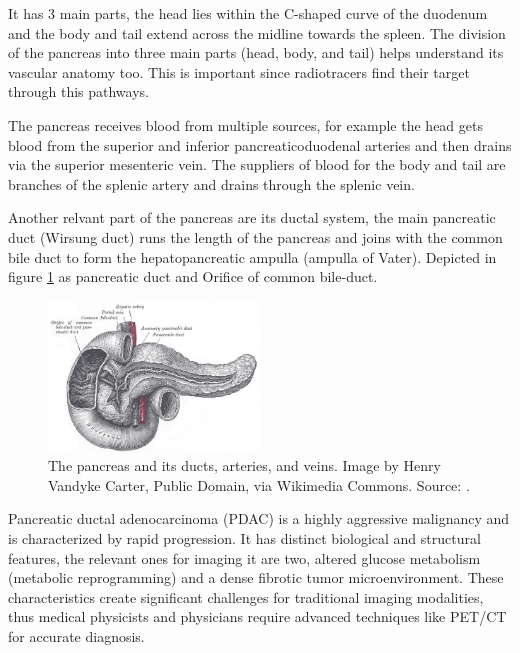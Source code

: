 \documentclass[11pt]{article} %
\begin{document}
It has 3 main parts, the head lies within the C-shaped curve of the duodenum and the body and tail extend across the midline towards the spleen. \cite{kenhub_pancreas} The division of the pancreas into three main parts (head, body, and tail) helps understand its vascular anatomy too. This is important since radiotracers find their target through this pathways. 

The pancreas receives blood from multiple sources, for example the head gets blood from the superior and inferior pancreaticoduodenal arteries and then drains via the superior mesenteric vein. The suppliers of blood for the body and tail are branches of the splenic artery and drains through the splenic vein. \cite{talathi2023,kenhub_pancreas}

Another relvant part of the pancreas are its ductal system, the main pancreatic duct (Wirsung duct) runs the length of the pancreas and joins with the common bile duct to form the hepatopancreatic ampulla (ampulla of Vater).\cite{kenhub_pancreas} Depicted in figure \ref{fig:pancreas_ducts} as pancreatic duct and Orifice of common bile-duct. 

\begin{figure}[h!]
	\centering
	\includegraphics[width=0.5\textwidth]{assets/Gray1100.jpg}
	\caption{The pancreas and its ducts, arteries, and veins. Image by Henry Vandyke Carter, Public Domain, via Wikimedia Commons. Source: \cite{gray_pancreas_ducts}.}
	\label{fig:pancreas_ducts}
\end{figure}


Pancreatic ductal adenocarcinoma (PDAC) is a highly aggressive malignancy and is characterized by rapid progression. It has distinct biological and structural features, the relevant ones for imaging it are two, altered glucose metabolism (metabolic reprogramming) and a dense fibrotic tumor microenvironment. These characteristics create significant challenges for traditional imaging modalities, thus medical physicists and physicians require advanced techniques like PET/CT for accurate diagnosis.
\end{document}
